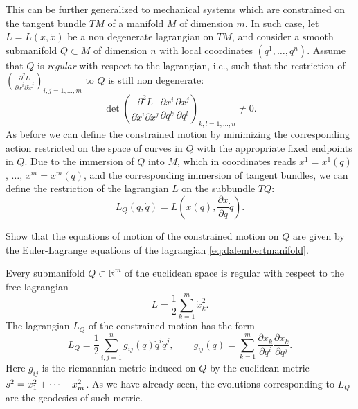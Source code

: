 \documentclass[english,fontsize=11pt,paper=a5,oneside]{scrbook}
\newcommand{\R}{\mathbb{R}}
\let\d\relax
\newcommand{\d}{\mathrm{d}}
\theoremstyle{definition}
\newenvironment{example}
  {\pushQED{\qed}\renewcommand{\qedsymbol}{$\lozenge$}\examplex}
  {\popQED\endexamplex}
\newenvironment{exercise}
  {\pushQED{\qed}\renewcommand{\qedsymbol}{$\maltese$}\exercisex}
  {\popQED\endexercisex}
\begin{document}
This can be further generalized to mechanical systems which are constrained on the tangent bundle $TM$ of a manifold $M$ of dimension $m$.
In such case, let  $L=L(x,\dot x)$ be a non degenerate lagrangian on $TM$, and consider a smooth submanifold $Q\subset M$ of dimension $n$ with local coordinates $(q^1,\ldots,q^n)$.
Assume that $Q$ is \emph{regular} with respect to the lagrangian, i.e., such that the restriction of $\left(\frac{\partial^2 L}{\partial \dot x^i \partial\dot x^j}\right)_{i,j=1,\ldots,m}$ to $Q$ is still non degenerate:
\begin{equation}
  \det\left(\frac{\partial^2 L}{\partial \dot x^i \partial\dot x^j}\frac{\partial x^i}{\partial q^k}\frac{\partial x^j}{\partial q^l}\right)_{k,l=1,\ldots,n} \neq 0.
\end{equation}
As before we can define the constrained motion by minimizing the corresponding action restricted on the space of curves in $Q$ with the appropriate fixed endpoints in $Q$. Due to the immersion of $Q$ into $M$, which in coordinates reads $x^1 = x^1(q)$, $\ldots$, $x^m=x^m(q)$, and the corresponding immersion of tangent bundles, we can define the restriction of the lagrangian $L$ on the subbundle $TQ$:
\begin{equation}\label{eq:dalembertmanifold}
  L_Q(q,\dot q) = L\left(x(q), \frac{\partial x}{\partial q}\dot q\right).
\end{equation}

\begin{exercise}
  Show that the equations of motion of the constrained motion on $Q$ are given by the Euler-Lagrange equations of the lagrangian \eqref{eq:dalembertmanifold}.
\end{exercise}

\begin{example}
  Every submanifold $Q\subset \R^m$ of the euclidean space is regular with respect to the free lagrangian
  \begin{equation}
    L = \frac12 \sum_{k=1}^m \dot x^2_k.
  \end{equation}
  The lagrangian $L_Q$ of the constrained motion has the form
  \begin{equation}
    L_Q = \frac12 \sum_{i,j=1}^n g_{ij}(q)\dot q^i\dot q^j, \qquad g_{ij}(q) = \sum_{k=1}^m \frac{\partial x_k}{\partial q^i}\frac{\partial x_k}{\partial q^j}.
  \end{equation}
  Here $g_{ij}$ is the riemannian metric induced on $Q$ by the euclidean metric $\d s^2 = \d x_1^2 + \cdots + \d x_m^2$.
  As we have already seen, the evolutions corresponding to $L_Q$ are the geodesics of such metric.
\end{example}
\end{document}

